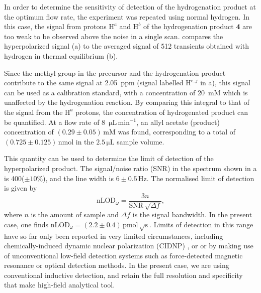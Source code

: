 In order to determine the sensitivity of detection of the hydrogenation product
at the optimum flow rate, the experiment was repeated using normal hydrogen.
In this case, the signal from  protons $\mathrm{H}^a$ and $\mathrm{H}^b$
of the hydrogenation product \textbf{4}
are too weak to be observed above the noise in a single scan.
compares the hyperpolarized signal (a) to the averaged signal of 512 transients
obtained with hydrogen in thermal equilibrium (b).

Since the methyl group in the
precursor and the hydrogenation product contribute to the same signal at 2.05~ppm
(signal labelled $\mathrm{H}^{e,j}$ in a),
this signal can be used as a calibration standard, with a concentration of 20~mM
which is unaffected by the hydrogenation reaction. By comparing this integral to that
of the signal from the $\mathrm{H}^a$ protons, the concentration
of hydrogenated product can be
quantified. At a flow rate of 8~$\mathrm{\mu L\,\text{min}^{-1}}$, an allyl acetate
(product) concentration of $(0.29\pm 0.05)\,\mathrm{mM}$ was found, corresponding to a total
of $(0.725\pm0.125)\,\text{nmol}$ in the $2.5\,\mathrm{\mu L}$ sample volume.


This quantity can be used to determine the limit of detection of the
hyperpolarized product. The signal/noise ratio (SNR) in the spectrum shown in
a is 400($\pm 10\%$), and the line width is $6\pm
0.5\,\text{Hz}$. The normalised limit of detection is given by \[
\text{nLOD}_\omega = \frac{3 n}{\text{SNR}\,\sqrt{\Delta f}}, \] where $n$ is
the amount of sample and $\Delta f$ is the signal bandwidth. In the present
case, one finds $\text{nLOD}_\omega = (2.2\pm
0.4)\,\text{pmol}\,\sqrt{\text{s}}$. Limits of detection in this range have so
far only been reported in very limited circumstances, including
chemically-induced dynamic nuclear polarization (CIDNP)
\cite{mompean2018pushing}, or or by making use of unconventional low-field
detection systems
such as force-detected magnetic resonance or optical detection methods\cite{Rugar:1992dm,Rugar:2004bc,Mamin:2007ff,Poggio:2010jf,
Maze:2008cs,Staudacher:2013kn,Rugar:2015by,McDermott:2002hp,
Budker:2007hz,Xu:2006kg,Blanchard:2013gs}. In the
present case, we are using conventional inductive detection, and retain the full
resolution and specificity that make high-field
analytical tool.


